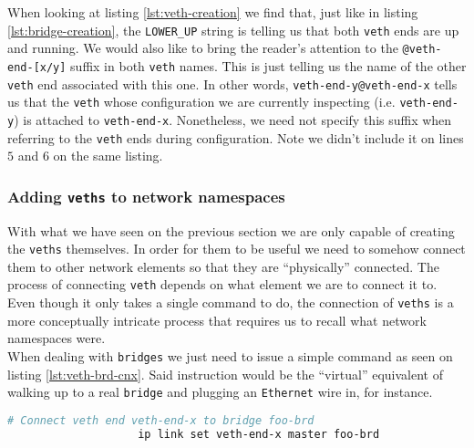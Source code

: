             When looking at listing \ref{lst:veth-creation} we find that, just like in listing \ref{lst:bridge-creation}, the \texttt{LOWER\_UP} string is telling us that both \texttt{veth} ends are up and running. We would also like to bring the reader's attention to the \texttt{@veth-end-[x/y]} suffix in both \texttt{veth} names. This is just telling us the name of the other \texttt{veth} end associated with this one. In other words, \texttt{veth-end-y@veth-end-x} tells us that the \texttt{veth} whose configuration we are currently inspecting (i.e. \texttt{veth-end-y}) is attached to \texttt{veth-end-x}. Nonetheless, we need not specify this suffix when referring to the \texttt{veth} ends during configuration. Note we didn't include it on lines $5$ and $6$ on the same listing.\\

            \subsubsection{Adding \texttt{veths} to network namespaces}
                With what we have seen on the previous section we are only capable of creating the \texttt{veths} themselves. In order for them to be useful we need to somehow connect them to other network elements so that they are ``physically'' connected. The process of connecting \texttt{veth} depends on what element we are to connect it to. Even though it only takes a single command to do, the connection of \texttt{veths} is a more conceptually intricate process that requires us to recall what network namespaces were.\\

                When dealing with \texttt{bridges} we just need to issue a simple command as seen on listing \ref{lst:veth-brd-cnx}. Said instruction would be the ``virtual'' equivalent of walking up to a real \texttt{bridge} and plugging an \texttt{Ethernet} wire in, for instance.\\

                \begin{lstlisting}[language = bash, caption = Connecting a \texttt{veth} end to a virtual \texttt{bridge}., label = lst:veth-brd-cnx]
                    # Connect veth end veth-end-x to bridge foo-brd
                    ip link set veth-end-x master foo-brd
                \end{lstlisting}

